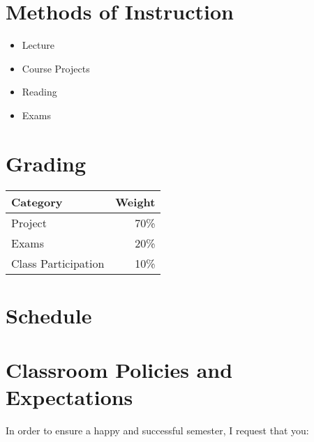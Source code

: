 \documentclass[11pt]{article}
\begin{document}
\section*{Methods of Instruction}
\begin{itemize}
    \item Lecture
    \item Course Projects
    \item Reading
    \item Exams
\end{itemize}


\section*{Grading}
\begin{tabular}{|l|r|}
    \hline
    {\bf Category} & {\bf Weight} \\
    \hline
    Project & 70\%\\
    \hline
    Exams & 20\%\\
    \hline
    Class Participation & 10\% \\
    \hline
\end{tabular}


\section*{Schedule}


\section*{Classroom Policies and Expectations}
In order to ensure a happy and successful semester, I request that you:
\end{document}

